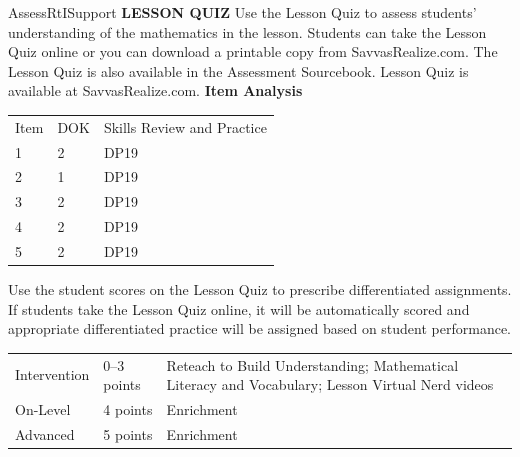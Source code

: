 \documentclass{article}
\newenvironment{te-addendum}[2]{}{}     %
\begin{document}
\begin{te-addendum}{Assess}{RtISupport}
\textbf{LESSON QUIZ}
Use the Lesson Quiz to assess students' understanding of the mathematics in the lesson.
Students can take the Lesson Quiz online or you can download a printable copy from SavvasRealize.com. The Lesson Quiz is also available in the Assessment Sourcebook.
Lesson Quiz is available at SavvasRealize.com.
\textbf{Item Analysis}
\begin{tabular}{lll}
Item & DOK & Skills Review and Practice \\
1 & 2 & DP19 \\
2 & 1 & DP19 \\
3 & 2 & DP19 \\
4 & 2 & DP19 \\
5 & 2 & DP19 \\
\end{tabular}
Use the student scores on the Lesson Quiz to prescribe differentiated assignments.
If students take the Lesson Quiz online, it will be automatically scored and appropriate differentiated practice will be assigned based on student performance.
\begin{tabular}{lll}
Intervention & 0--3 points & Reteach to Build Understanding; Mathematical Literacy and Vocabulary; Lesson Virtual Nerd videos \\
On-Level & 4 points & Enrichment \\
Advanced & 5 points & Enrichment \\
\end{tabular}
\end{te-addendum}
\end{document}
